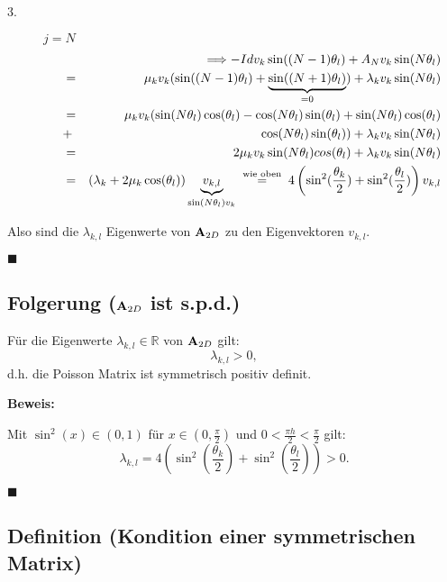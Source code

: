\begin{description}
\item[3.] $j = N$
\begin{eqnarray}
&&\Longrightarrow -Id v_{k} \sin((N-1)\theta_{l}) + A_{N} v_{k} \sin(N \theta_{l}) \notag \\
&=& \mu_{k} v_{k} (\sin((N-1)\theta_{l}) + \underbrace{\sin((N+1)\theta_{l})}_{= 0}) + \lambda_{k} v_{k} \sin(N\theta_{l}) \notag \\
&=& \mu_{k} v_{k} (\sin(N\theta_{l})\cos(\theta_{l}) - \cos(N\theta_{l})\sin(\theta_{l}) + \sin(N\theta_{l})\cos(\theta_{l}) \notag \\
&+& \cos(N\theta_{l})\sin(\theta_{l})) + \lambda_{k} v_{k} \sin(N \theta_{l}) \notag \\
&=& 2\mu_{k} v_{k} \sin(N\theta_{l})cos(\theta_{l}) + \lambda_{k} v_{k} \sin(N\theta_{l}) \notag \\
&=& (\lambda_{k} + 2\mu_{k}\cos(\theta_{l})) \underbrace{v_{k,l}}_{\sin(N\theta_{l}) v_{k}} \overset{\textnormal{ wie oben }}{=} 4 \left(\sin^{2}(\frac {\theta_{k}} {2}) + \sin^{2}(\frac {\theta_{l}} {2})\right) v_{k,l} \notag
\end{eqnarray}
\end{description}
Also sind die $\lambda_{k,l}$ Eigenwerte von ${\textbf{A}}_{2D}$ zu den Eigenvektoren $v_{k,l}$.
\begin{flushright}
$\blacksquare$
\end{flushright}

\subsection{Folgerung (${\textbf{A}}_{2D}$ ist s.p.d.)}

Für die Eigenwerte $\lambda_{k,l} \in \mathbb{R}$ von ${\textbf{A}}_{2D}$ gilt:
\begin{equation}
\lambda_{k,l} > 0,
\end{equation}
d.h. die Poisson Matrix ist symmetrisch positiv definit.

\textbf{Beweis:}

Mit $\sin^{2}(x) \in (0,1)$ für $x \in (0,\frac{\pi}{2})$ und $0 < \frac{\pi h}{2} < \frac{\pi}{2}$ gilt:
\begin{equation}
\lambda_{k,l} = 4 \left(\sin^{2}(\frac {\theta_{k}} {2}) + \sin^{2}(\frac {\theta_{l}} {2})\right) > 0.
\end{equation}
\begin{flushright}
$\blacksquare$
\end{flushright}

\subsection{Definition (Kondition einer symmetrischen Matrix)}\label{ss.Definition Kondition einer Matrix}

